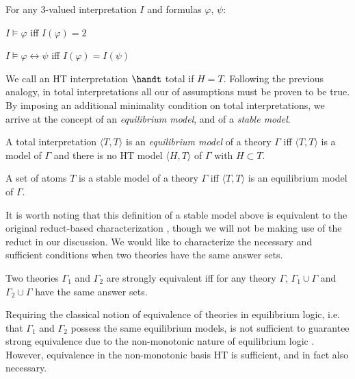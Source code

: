 \begin{proposition}
For any 3-valued interpretation $I$ and formulas $\varphi$, $\psi$:
\begin{description}
  \item $I \models \varphi$ iff $I(\varphi) = 2$
  \item $I \models \varphi \leftrightarrow \psi$ iff $I(\varphi) = I(\psi)$
\end{description}
\end{proposition}

We call an HT interpretation $\handt$ total if $H=T$. Following the
previous analogy, in total interpretations all our of assumptions must
be proven to be true. By imposing an additional minimality condition
on total interpretations, we arrive at the concept of an \textit{equilibrium
model}, and of a \textit{stable model}.

\begin{definition}
  A total interpretation $\langle T,T\rangle$ is an \emph{equilibrium
    model} of a theory $\Gamma$ iff $\langle T,T\rangle$ is a model of
  $\Gamma$ and there is no HT model $\langle H,T\rangle$ of $\Gamma$
  with $H \subset T$.
\end{definition}

\begin{definition}
  A set of atoms $T$ is a stable model of a theory $\Gamma$ iff
  $\langle T,T\rangle$ is an equilibrium model of $\Gamma$.
\end{definition}

It is worth noting that this definition of a stable model above is
equivalent to the original reduct-based characterization
\cite{lipeva01a}, though we will not be making use of the reduct in
our discussion. We would like to characterize the necessary and
sufficient conditions when two theories have the same answer sets.

\begin{definition}
  Two theories $\Gamma_1$ and $\Gamma_2$ are strongly equivalent iff for
  any theory $\Gamma$, $\Gamma_1 \cup \Gamma$ and
  $\Gamma_2 \cup \Gamma$ have the same answer sets.
\end{definition}

Requiring the classical notion of equivalence of theories in
equilibrium logic, i.e. that $\Gamma_1$ and $\Gamma_2$ possess the same
equilibrium models, is not sufficient to guarantee strong equivalence
due to the non-monotonic nature of equilibrium logic \cite{lipeva01a}.
However, equivalence in the non-monotonic basis HT is sufficient, and in
fact also necessary.

